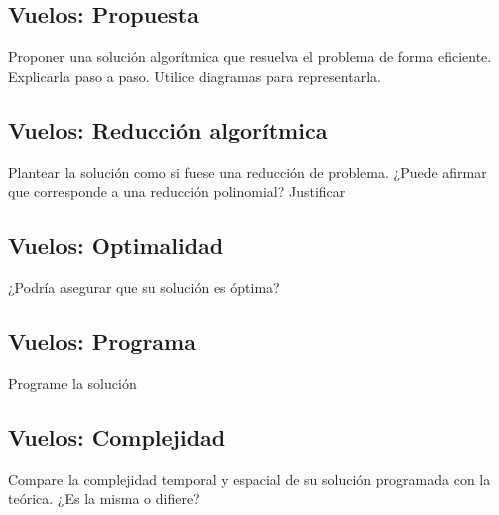 \documentclass[titlepage,a4paper]{article}
\begin{document}
\setcounter{subsection}{0}%
\renewcommand{\thesubsection}{\arabic{subsection}}%

\newpage\subsection{Vuelos: Propuesta}\label{sec:parte1_1}
\begin{tcolorbox}[colback=blue!5!white,colframe=blue!75!black,title=Enunciado P1.1]
    Proponer una solución algorítmica que resuelva el problema de forma eficiente. Explicarla paso a paso. Utilice diagramas para representarla.
\end{tcolorbox}



\filbreak
\subsection{Vuelos: Reducción algorítmica}\label{sec:parte1_2}
\begin{tcolorbox}[colback=blue!5!white,colframe=blue!75!black,title=Enunciado P1.2]
    Plantear la solución como si fuese una reducción de problema.
    ¿Puede afirmar que corresponde a una reducción polinomial? Justificar
\end{tcolorbox}



\filbreak\subsection{Vuelos: Optimalidad}\label{sec:parte1_3}
\begin{tcolorbox}[colback=blue!5!white,colframe=blue!75!black,title=Enunciado P1.3]
    ¿Podría asegurar que su solución es óptima?
\end{tcolorbox}



\newpage\subsection{Vuelos: Programa}\label{sec:parte1_4}
\begin{tcolorbox}[colback=blue!5!white,colframe=blue!75!black,title=Enunciado P1.4]
    Programe la solución
\end{tcolorbox}



\newpage\subsection{Vuelos: Complejidad}\label{sec:parte1_5}
\begin{tcolorbox}[colback=blue!5!white,colframe=blue!75!black,title=Enunciado P1.5]
    Compare la complejidad temporal y espacial de su solución programada con la teórica.
    ¿Es la misma o difiere?
\end{tcolorbox}
\end{document}
